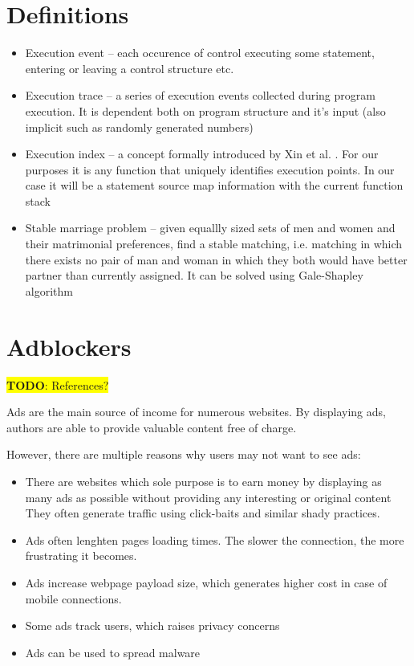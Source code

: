 \documentclass[en]{pracamgr}
\newcommand{\todo}[1]{\colorbox{yellow}{ \color{red} \textbf{TODO}: {#1}}}
\begin{document}
\section{Definitions}

\begin{itemize}
  \item Execution event -- each occurence of control executing some statement, entering or leaving a control structure etc.
  \item Execution trace -- a series of execution events collected during program execution. 
           It is dependent both on program structure and it's input (also implicit such as randomly generated numbers)
  \item Execution index -- a concept formally introduced by Xin et al. \cite{sigplan:execution-indexing}. 
                                         For our purposes it is any function that uniquely identifies execution points. In our case it will
                                         be a statement source map information with the current function stack
  \item Stable marriage problem -- given equallly sized sets of men and women and their matrimonial preferences,
                                                       find a stable matching, i.e. matching in which there exists no pair of man and woman 
                                                       in which they both would have better partner than currently assigned.
                                                       It can be solved using Gale-Shapley algorithm \cite{wiki:smp}
\end{itemize}

\section{Adblockers}
\todo{References?}

Ads are the main source of income for numerous websites. By displaying ads, authors are able to provide
valuable content free of charge. 

However, there are multiple reasons why users may not want to see ads: 
\begin{itemize}
  \item There are websites which sole purpose is to earn money by displaying as many ads 
           as possible without providing any interesting or original content
           They often generate traffic using click-baits and similar shady practices.
  \item Ads often lenghten pages loading times. The slower the connection, the more frustrating it becomes.
  \item Ads increase webpage payload size, which generates higher cost in case of mobile connections.
  \item Some ads track users, which raises privacy concerns
  \item Ads can be used to spread malware
\end{itemize}
\end{document}
